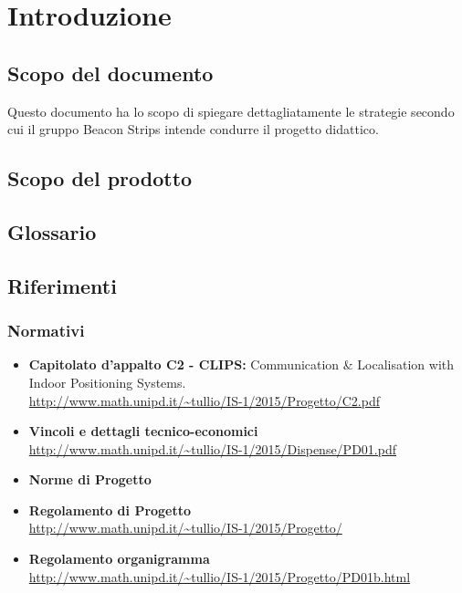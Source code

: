 \section{Introduzione}
	\subsection{Scopo del documento} 
	Questo documento ha lo scopo di spiegare dettagliatamente le strategie secondo cui il gruppo Beacon Strips intende condurre il progetto didattico.
	\subsection{Scopo del prodotto}
	\SCOPO
	\subsection{Glossario}
	\GLOSSARIO
	\subsection{Riferimenti}
		\subsubsection{Normativi}
			\begin{itemize}
				\item \textbf{Capitolato d'appalto C2 - CLIPS:} Communication \& Localisation with Indoor Positioning Systems. \\
				\url{http://www.math.unipd.it/~tullio/IS-1/2015/Progetto/C2.pdf}
				\item \textbf{Vincoli e dettagli tecnico-economici} \\
				\url{http://www.math.unipd.it/~tullio/IS-1/2015/Dispense/PD01.pdf}
				\item \textbf{Norme di Progetto} \\ \NPfile
				\item \textbf{Regolamento di Progetto} \\
				\url{http://www.math.unipd.it/~tullio/IS-1/2015/Progetto/}
				\item \textbf{Regolamento organigramma} \\
				\url{http://www.math.unipd.it/~tullio/IS-1/2015/Progetto/PD01b.html}
			\end{itemize}	
			
